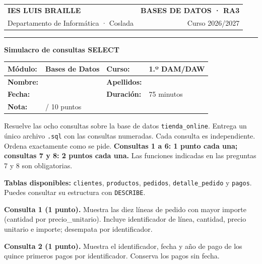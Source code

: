 \documentclass[11pt,a4paper]{article}
\begin{document}
\begin{tabularx}{\textwidth}{@{}Xr@{}}
{\color{primary}\Large\bfseries IES LUIS BRAILLE} & {\color{secondary}\bfseries BASES DE DATOS · RA3} \\
Departamento de Informática · Coslada & Curso 2026/2027 \\
\end{tabularx}
{\color{primary}\rule{\textwidth}{1.2pt}}
\begin{center}{\Large\bfseries Simulacro de consultas SELECT}\end{center}
\vspace{0.2cm}
\begin{tabularx}{\textwidth}{|p{2.4cm}|X|p{2.2cm}|X|}
\hline
\textbf{Módulo:} & Bases de Datos & \textbf{Curso:} & 1.º DAM/DAW \\ \hline
\textbf{Nombre:} & & \textbf{Apellidos:} & \\ \hline
\textbf{Fecha:} & & \textbf{Duración:} & 75 minutos \\ \hline
\textbf{Nota:} & \multicolumn{3}{l|}{\hspace{2cm}/ 10 puntos} \\ \hline
\end{tabularx}
\vspace{0.35cm}
\begin{tcolorbox}[title=Instrucciones]
Resuelve las ocho consultas sobre la base de datos \texttt{tienda\_online}. Entrega un único archivo \texttt{.sql} con las consultas numeradas. Cada consulta es independiente. Ordena exactamente como se pide. \textbf{Consultas 1 a 6: 1 punto cada una; consultas 7 y 8: 2 puntos cada una.} Las funciones indicadas en las preguntas 7 y 8 son obligatorias.
\end{tcolorbox}
{\small\textbf{Tablas disponibles:} \texttt{clientes}, \texttt{productos}, \texttt{pedidos}, \texttt{detalle\_pedido} y \texttt{pagos}. Puedes consultar su estructura con \texttt{DESCRIBE}.}
\par\vspace{0.25cm}
\textbf{Consulta 1 (1 punto).} Muestra las diez líneas de pedido con mayor importe (cantidad por precio\_unitario). Incluye identificador de línea, cantidad, precio unitario e importe; desempata por identificador.\par\vspace{0.65em}
\textbf{Consulta 2 (1 punto).} Muestra el identificador, fecha y año de pago de los quince primeros pagos por identificador. Conserva los pagos sin fecha.\par\vspace{0.65em}
\end{document}
